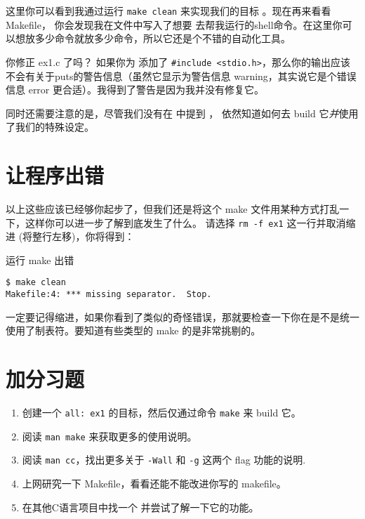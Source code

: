这里你可以看到我通过运行 \verb|make clean| 来实现我们的目标 。现在再来看看 Makefile， 你会发现我在文件中写入了想要  去帮我运行的shell命令。在这里你可以想放多少命令就放多少命令，所以它还是个不错的自动化工具。

\begin{aside}{你修正 ex1.c 了吗？}
如果你为  添加了 \verb|#include <stdio.h>|，那么你的输出应该不会有关于puts的警告信息（虽然它显示为警告信息 warning，其实说它是个错误信息 error 更合适）。我得到了警告是因为我并没有修复它。
\end{aside}

同时还需要注意的是，尽管我们没有在  中提到  ， 依然知道如何去 build 它\emph{并}使用了我们的特殊设定。


\section{让程序出错}

以上这些应该已经够你起步了，但我们还是将这个 make 文件用某种方式打乱一下，这样你可以进一步了解到底发生了什么。 请选择 \verb|rm -f ex1| 这一行并取消缩进 (将整行左移)，你将得到：

\begin{Terminal}{运行 make 出错}
\begin{lstlisting}
$ make clean
Makefile:4: *** missing separator.  Stop.
\end{lstlisting}
\end{Terminal}

一定要记得缩进，如果你看到了类似的奇怪错误，那就要检查一下你在是不是统一使用了制表符。要知道有些类型的 make 的是非常挑剔的。


\section{加分习题}

\begin{enumerate}
\item 创建一个 \verb|all: ex1| 的目标，然后仅通过命令 \verb|make| 来 build 它。
\item 阅读 \verb|man make| 来获取更多的使用说明。
\item 阅读 \verb|man cc|，找出更多关于 \verb|-Wall| 和 \verb|-g| 这两个 flag 功能的说明.
\item 上网研究一下 Makefile，看看还能不能改进你写的 makefile。
\item 在其他C语言项目中找一个  并尝试了解一下它的功能。
\end{enumerate}

